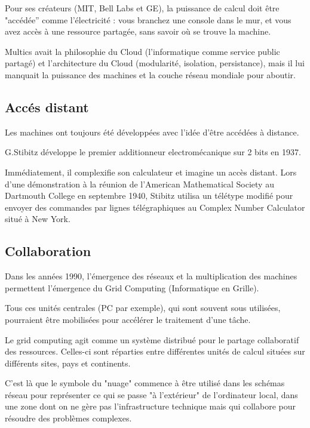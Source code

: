 \documentclass{report} %
\begin{document}
Pour ses créateurs (MIT, Bell Labs et GE), la puissance de calcul doit
être "accédée'' comme l'électricité : vous branchez une console dans
le mur, et vous avez accès à une ressource partagée, sans savoir où se
trouve la machine.

Multics avait la philosophie du Cloud (l'informatique comme service
public partagé) et l'architecture du Cloud (modularité, isolation,
persistance), mais il lui manquait la puissance des machines et la
couche réseau mondiale pour aboutir.

\subsection{Accés distant}
Les machines ont toujours été développées avec l'idée d'être accédées à distance.

G.Stibitz développe le premier additionneur electromécanique
sur 2 bits en 1937. \cite{WikipediaAdder2026}


Immédiatement, il complexifie son calculateur et imagine un accès
distant. Lors d'une démonstration à la réunion de l'American
Mathematical Society au Dartmouth College en septembre 1940, Stibitz
utilisa un télétype modifié pour envoyer des commandes par lignes
télégraphiques au Complex Number Calculator situé à New York. \cite{Stibitz2012}


\subsection{Collaboration}
Dans les années 1990, l'émergence des réseaux et la multiplication des
machines permettent l'émergence du Grid Computing (Informatique en Grille).

Tous ces unités centrales (PC par exemple), qui sont souvent sous
utilisées, pourraient être mobilisées pour accélérer le traitement d'une
tâche.

Le grid computing agit comme un système distribué pour le partage
collaboratif des ressources.  Celles-ci sont réparties entre
différentes unités de calcul situées sur différents sites, pays et
continents.

C’est là que le symbole du "nuage" commence à être utilisé dans les
schémas réseau pour représenter ce qui se passe "à l'extérieur" de
l'ordinateur local, dans une zone dont on ne gère pas l'infrastructure
technique mais qui collabore pour résoudre des problèmes complexes.
\end{document}

